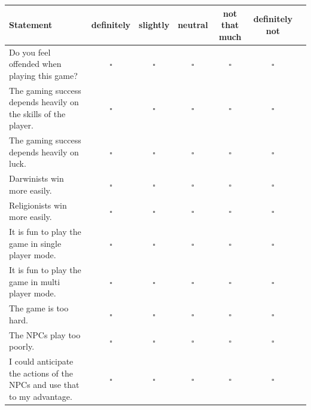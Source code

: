 \documentclass[11pt,a4paper,titlepage,table]{article}
\begin{document}
\begin{table}[H]
\begin{tabularx}{1.1\textwidth}{|X|S|S|S|S|S|X|}
	\hline
  		Statement& 
  			definitely & slightly & neutral & not that much & definitely not \\
  	\hline
	  	Do you feel offended when playing this game?& 
	  	$\square$ & $\square$ & $\square$ & $\square$ & $\square$ \\
  	\hline
  		The gaming success depends heavily on the skills of the player.& 
  			$\square$ & $\square$ & $\square$ & $\square$ & $\square$ \\
  	\hline
  		The gaming success depends heavily on luck. & 
  			$\square$ & $\square$ & $\square$ & $\square$ & $\square$ \\
  	\hline
  		Darwinists win more easily.& 
  			$\square$ & $\square$ & $\square$ & $\square$ & $\square$ \\
  	\hline
  		Religionists win more easily.& 
  			$\square$ & $\square$ & $\square$ & $\square$ & $\square$ \\
  	\hline
  		It is fun to play the game  in single player mode.& 
  			$\square$ & $\square$ & $\square$ & $\square$ & $\square$ \\
  	\hline
  		It is fun to play the game in multi player mode.& 
  			$\square$ & $\square$ & $\square$ & $\square$ & $\square$ \\
  	\hline
  		The game is too hard.& 
  			$\square$ & $\square$ & $\square$ & $\square$ & $\square$ \\
  	\hline
  		The NPCs play too poorly.& 
  			$\square$ & $\square$ & $\square$ & $\square$ & $\square$ \\
  	\hline
  		I could anticipate the actions of the NPCs and use that to my advantage.& 
  			$\square$ & $\square$ & $\square$ & $\square$ & $\square$ \\
	\hline
\end{tabularx}
\end{table}
\end{document}
